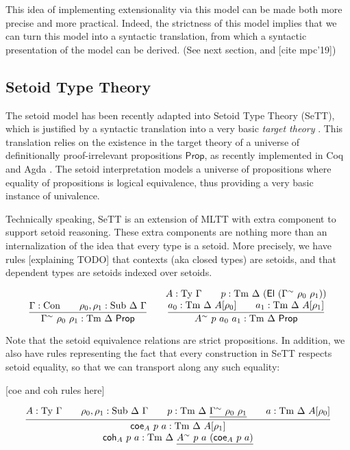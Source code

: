 \documentclass{easychair}
\newcommand{\GG}{\Gamma}
\newcommand{\DD}{\Delta}
\newcommand{\GD}{\Delta}
\newcommand{\coe}{\textsf{coe}}
\newcommand{\coh}{\textsf{coh}}
\newcommand{\tyj}[2]{#2 : \Ty\ #1}
\newcommand{\tmj}[3]{#2 : \Tm\ #1\ #3}
\newcommand{\subj}[3]{#1 : \mathrm{Sub}\ #2\ #3}
\newcommand{\Prop}{\textsf{Prop}}
\newcommand{\Con}{\mathrm{Con}}
\newcommand{\Ty}{\mathrm{Ty}}
\newcommand{\Tm}{\mathrm{Tm}}
\newcommand{\El}{\textsf{El}}
\begin{document}
This idea of implementing extensionality via this model can be made both more
precise and more practical. Indeed, the strictness of this model implies that we
can turn this model into a syntactic translation, from which a syntactic
presentation of the model can be derived. (See next section, and [cite mpc'19])

\subsection{Setoid Type Theory}

The setoid model has been recently adapted into Setoid Type Theory (SeTT), which
is justified by a syntactic translation into a very basic \emph{target theory}
\cite{mpc19}. This translation relies on the existence in the target theory of a
universe of definitionally proof-irrelevant propositions $\Prop$, as recently
implemented in Coq and Agda \cite{gilbert}. The setoid interpretation models a
universe of propositions where equality of propositions is logical equivalence,
thus providing a very basic instance of univalence.

Technically speaking, SeTT is an extension of MLTT with extra component to
support setoid reasoning. These extra components are nothing more than an
internalization of the idea that every type is a setoid. More precisely, we have
rules [explaining TODO] that contexts (aka closed types) are setoids, and that
dependent types are setoids indexed over setoids.

\[
\infer{
  \GG^\sim\ \rho_0\ \rho_1 : \Tm\ \DD\ \Prop
}{
  \GG : \Con \qquad \subj{\rho_0, \rho_1}{\DD}{\GG}
}
\qquad
\infer{
  A^{\sim}\ p\ a_0\ a_1 : \Tm\ \DD\ \Prop
}{
  \deduce{
    a_0 : \Tm\ \DD\ A[\rho_0] \qquad a_1 : \Tm\ \DD\ A[\rho_1]
  }{
    A : \Ty\ \GG \qquad p : \Tm\ \DD\ (\El\ (\GG^{\sim}\ \rho_0\ \rho_1))
  }
}
\]

Note that the setoid equivalence relations are strict propositions. In addition,
we also have rules representing the fact that every construction in SeTT
respects setoid equality, so that we can transport along any such equality:

[coe and coh rules here]

    \[
    \infer{
      \deduce{
        \tmj{\GD}{\coh_A\ p\ a}{\underline{A^\sim\ p\ a\ (\coe_A\ p\ a)}}
      }{
        \tmj{\GD}{\coe_A\ p\ a}{A[\rho_1]}
      }
    }{
      \tyj{\GG}{A} \qquad \subj{\rho_0, \rho_1}{\GD}{\GG} \qquad
      \tmj{\GD}{p}{\underline{\GG^\sim\ \rho_0\ \rho_1}}\qquad
      \tmj{\GD}{a}{A[\rho_0]}
    }
    \]
\end{document}
